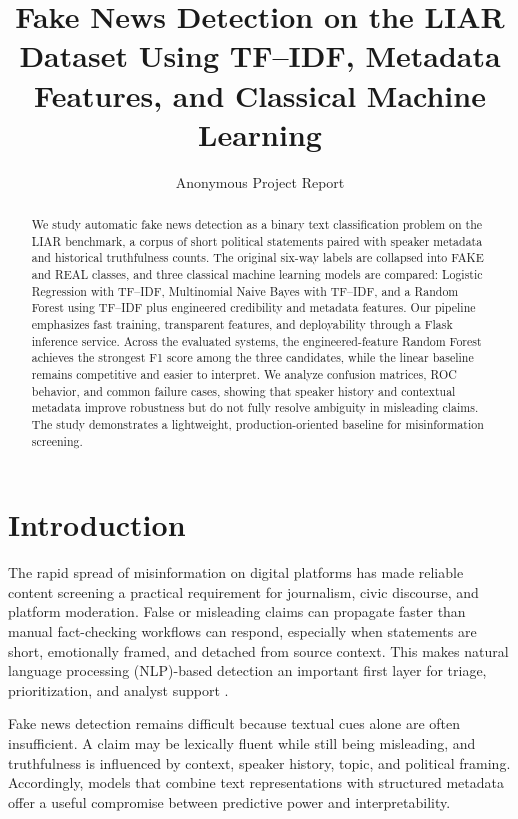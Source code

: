 \documentclass[10pt,twocolumn,letterpaper]{article}
\title{Fake News Detection on the LIAR Dataset Using TF--IDF, Metadata Features, and Classical Machine Learning}
\author{
Anonymous Project Report
}
\newcommand{\BestModel}{Random Forest}
\begin{document}
\maketitle

\begin{abstract}
We study automatic fake news detection as a binary text classification problem on the LIAR benchmark, a corpus of short political statements paired with speaker metadata and historical truthfulness counts. The original six-way labels are collapsed into FAKE and REAL classes, and three classical machine learning models are compared: Logistic Regression with TF--IDF, Multinomial Naive Bayes with TF--IDF, and a Random Forest using TF--IDF plus engineered credibility and metadata features. Our pipeline emphasizes fast training, transparent features, and deployability through a Flask inference service. Across the evaluated systems, the engineered-feature \BestModel{} achieves the strongest F1 score among the three candidates, while the linear baseline remains competitive and easier to interpret. We analyze confusion matrices, ROC behavior, and common failure cases, showing that speaker history and contextual metadata improve robustness but do not fully resolve ambiguity in misleading claims. The study demonstrates a lightweight, production-oriented baseline for misinformation screening.
\end{abstract}

\section{Introduction}
The rapid spread of misinformation on digital platforms has made reliable content screening a practical requirement for journalism, civic discourse, and platform moderation. False or misleading claims can propagate faster than manual fact-checking workflows can respond, especially when statements are short, emotionally framed, and detached from source context. This makes natural language processing (NLP)-based detection an important first layer for triage, prioritization, and analyst support \cite{vosoughi2018spread,zhou2020survey}.

Fake news detection remains difficult because textual cues alone are often insufficient. A claim may be lexically fluent while still being misleading, and truthfulness is influenced by context, speaker history, topic, and political framing. Accordingly, models that combine text representations with structured metadata offer a useful compromise between predictive power and interpretability.
\end{document}
